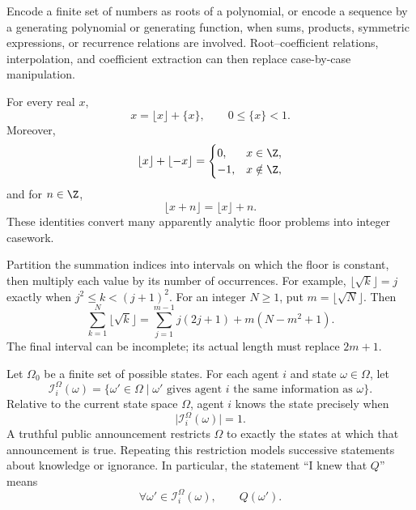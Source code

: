     \begin{strategy}
        Encode a finite set of numbers as roots of a polynomial, or encode a
        sequence by a generating polynomial or generating function, when sums,
        products, symmetric expressions, or recurrence relations are involved.
        Root--coefficient relations, interpolation, and coefficient extraction
        can then replace case-by-case manipulation.
    \end{strategy}

    \begin{tactic}
        For every real $x$,
        \[
            x=\lfloor x\rfloor+\{x\},
            \qquad
            0\leq\{x\}<1.
        \]
        Moreover,
        \[
            \lfloor x\rfloor+\lfloor-x\rfloor
            =
            \begin{cases}
                0, & x\in\Z,\\
                -1, & x\notin\Z,
            \end{cases}
        \]
        and for $n\in\Z$,
        \[
            \lfloor x+n\rfloor=\lfloor x\rfloor+n.
        \]
        These identities convert many apparently analytic floor problems into
        integer casework.
    \end{tactic}

    \begin{tactic}\label{r4:floor-sum}
        Partition the summation indices into intervals on which the floor is
        constant, then multiply each value by its number of occurrences.
        For example, $\lfloor\sqrt{k}\rfloor=j$ exactly when
        $j^2\leq k<(j+1)^2$. For an integer $N\geq1$, put
        $m=\lfloor\sqrt N\rfloor$. Then
        \[
            \sum_{k=1}^{N}\lfloor\sqrt{k}\rfloor
            =\sum_{j=1}^{m-1}j(2j+1)+m(N-m^2+1).
        \]
        The final interval can be incomplete; its actual length must replace
        $2m+1$.
    \end{tactic}

    \begin{strategy}
        Let $\Omega_0$ be a finite set of possible states. For each agent $i$ and
        state $\omega\in\Omega$, let
        \[
            \mathcal{I}_i^\Omega(\omega)
            =
            \{\omega'\in\Omega\mid
              \omega'\text{ gives agent }i\text{ the same information as }\omega\}.
        \]
        Relative to the current state space $\Omega$, agent $i$ knows the state
        precisely when
        \[
            \bigl|\mathcal{I}_i^\Omega(\omega)\bigr|=1.
        \]
        A truthful public announcement restricts $\Omega$ to exactly the states
        at which that announcement is true. Repeating this restriction models
        successive statements about knowledge or ignorance. In particular, the
        statement ``I knew that $Q$'' means
        \[
            \forall\omega'\in\mathcal{I}_i^\Omega(\omega),
            \qquad
            Q(\omega').
        \]
    \end{strategy}

